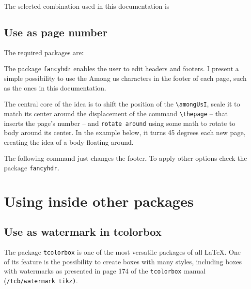 \documentclass[12pt]{article}
\begin{document}
The selected combination used in this documentation is
\begin{FHZtcbAmongUs}
\usepackage[cor=violet!70!white,BG,type=1]{tikz-among-us-watermark-eso-pic}
\end{FHZtcbAmongUs}

\subsection{Use as page number}

The required packages are:
\begin{FHZtcbAmongUs}
\usepackage{fancyhdr}
\end{FHZtcbAmongUs}
The package \texttt{fancyhdr} enables the user to edit headers and footers. I present a simple possibility to use the Among us characters in the footer of each page, such as the ones in this documentation.

The central core of the idea is to shift the position of the \verb|\amongUsI|, scale it to match its center around the displacement of the command \verb|\thepage| -- that inserts the page's number -- and \texttt{rotate around} using some math to rotate to body around its center.
In the example below, it turns 45 degrees each new page, creating the idea of a body floating around.

The following command just changes the footer. To apply other options check the package \texttt{fancyhdr}.
\begin{FHZtcbAmongUs}
\end{FHZtcbAmongUs}

\section{Using inside other packages}

\subsection{Use as watermark in tcolorbox}

The package \texttt{tcolorbox} is one of the most versatile packages of all {\LaTeX}. One of its feature is the possibility to create boxes with many styles, including boxes with watermarks as presented in page 174 of the \texttt{tcolorbox} manual (\texttt{/tcb/watermark tikz)}.
\begin{FHZtcbAmongUs}
\usepackage{tcolorbox}
\end{FHZtcbAmongUs}
\end{document}
